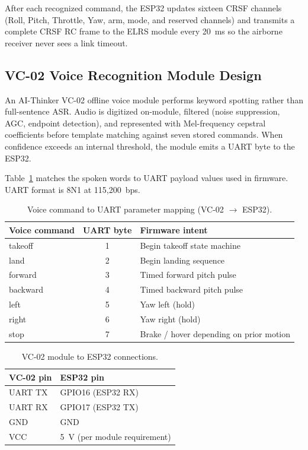 After each recognized command, the ESP32 updates sixteen CRSF channels (Roll, Pitch, Throttle,
Yaw, arm, mode, and reserved channels) and transmits a complete CRSF RC frame to the ELRS module
every 20~ms so the airborne receiver never sees a link timeout.

\subsection{VC-02 Voice Recognition Module Design}

An AI-Thinker VC-02 offline voice module performs keyword spotting rather than full-sentence ASR\@.
Audio is digitized on-module, filtered (noise suppression, AGC, endpoint detection), and represented
with Mel-frequency cepstral coefficients before template matching against seven stored commands.
When confidence exceeds an internal threshold, the module emits a UART byte to the ESP32.

Table~\ref{tab:vc-map} matches the spoken words to UART payload values used in firmware.
UART format is 8N1 at 115,200~bps.

\begin{table}[htb!]
    \centering
    \caption{Voice command to UART parameter mapping (VC-02 $\rightarrow$ ESP32).}
    \label{tab:vc-map}
    \begin{tabularx}{\linewidth}{l c X}
        \hline
        \textbf{Voice command} & \textbf{UART byte} & \textbf{Firmware intent} \\
        \hline
        takeoff & 1 & Begin takeoff state machine \\
        land    & 2 & Begin landing sequence \\
        forward & 3 & Timed forward pitch pulse \\
        backward & 4 & Timed backward pitch pulse \\
        left    & 5 & Yaw left (hold) \\
        right   & 6 & Yaw right (hold) \\
        stop    & 7 & Brake / hover depending on prior motion \\
        \hline
    \end{tabularx}
\end{table}

\begin{table}[htb!]
    \centering
    \caption{VC-02 module to ESP32 connections.}
    \label{tab:vc02-hw}
    \begin{tabularx}{\linewidth}{l l}
        \hline
        \textbf{VC-02 pin} & \textbf{ESP32 pin} \\
        \hline
        UART TX & GPIO16 (ESP32 RX) \\
        UART RX & GPIO17 (ESP32 TX) \\
        GND     & GND \\
        VCC     & 5~V (per module requirement) \\
        \hline
    \end{tabularx}
\end{table}

